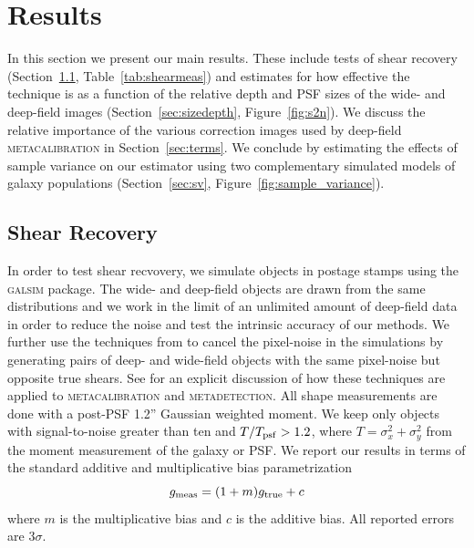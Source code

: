 \documentclass[twocolumn]{openjournal}
\makeatletter
\newcommand{\mdet}{\textsc{metadetection}\@\xspace}
\newcommand{\mcal}{\textsc{metacalibration}\@\xspace}
\newcommand{\galsim}{\textsc{galsim}\@\xspace}
\makeatother
\begin{document}
\section{Results}\label{sec:results}

In this section we present our main results. These include tests of shear recovery
(Section~\ref{sec:mc}, Table~\ref{tab:shearmeas}) and estimates for how effective the
technique is as a function of the relative depth and PSF sizes of the wide- and
deep-field images (Section~\ref{sec:sizedepth}, Figure~\ref{fig:s2n}). We discuss the
relative importance of the various correction images used by deep-field \mcal in
Section~\ref{sec:terms}. We conclude by estimating the effects of sample variance on our
estimator using two complementary simulated models of galaxy populations
(Section~\ref{sec:sv}, Figure~\ref{fig:sample_variance}).


\subsection{Shear Recovery}\label{sec:mc}

In order to test shear recvovery, we simulate objects in postage stamps using the
\galsim package. The wide- and deep-field objects are drawn from the same distributions
and we work in the limit of an unlimited amount of deep-field data in order to reduce
the noise and test the intrinsic accuracy of our methods. We further use the techniques
from \citet{pujol2019} to cancel the pixel-noise in the simulations by generating pairs
of deep- and wide-field objects with the same pixel-noise but opposite true shears. See
\citet{SheldonMdet2020} for an explicit discussion of how these techniques are applied
to \mcal and \mdet. All shape measurements are done with a post-PSF 1.2'' Gaussian
weighted moment. We keep only objects with signal-to-noise greater than ten and
$T/T_{\rm psf} > 1.2$, where $T=\sigma_{x}^2 + \sigma_{y}^2$ from the moment measurement
of the galaxy or PSF. We report our results in terms of the standard additive and
multiplicative bias parametrization \citep[see, e.g.,][]{heymans2006}
\begin{equation*}
g_{\rm meas} = (1+m)g_{\rm true} + c
\end{equation*}
where $m$ is the multiplicative bias and $c$ is the additive bias. All reported errors
are $3\sigma$.
\end{document}
